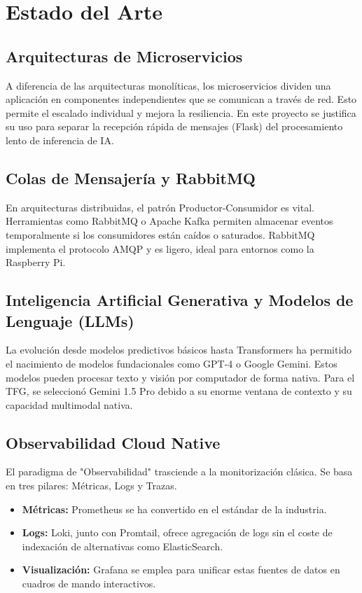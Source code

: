\section{Estado del Arte}
\label{sec:estado_arte}

\subsection{Arquitecturas de Microservicios}
A diferencia de las arquitecturas monolíticas, los microservicios dividen una aplicación en componentes independientes que se comunican a través de red. Esto permite el escalado individual y mejora la resiliencia. En este proyecto se justifica su uso para separar la recepción rápida de mensajes (Flask) del procesamiento lento de inferencia de IA.

\subsection{Colas de Mensajería y RabbitMQ}
En arquitecturas distribuidas, el patrón Productor-Consumidor es vital. Herramientas como RabbitMQ o Apache Kafka permiten almacenar eventos temporalmente si los consumidores están caídos o saturados. RabbitMQ implementa el protocolo AMQP y es ligero, ideal para entornos como la Raspberry Pi.

\subsection{Inteligencia Artificial Generativa y Modelos de Lenguaje (LLMs)}
La evolución desde modelos predictivos básicos hasta Transformers ha permitido el nacimiento de modelos fundacionales como GPT-4 o Google Gemini. Estos modelos pueden procesar texto y visión por computador de forma nativa. Para el TFG, se seleccionó Gemini 1.5 Pro debido a su enorme ventana de contexto y su capacidad multimodal nativa.

\subsection{Observabilidad Cloud Native}
El paradigma de "Observabilidad" trasciende a la monitorización clásica. Se basa en tres pilares: Métricas, Logs y Trazas.
\begin{itemize}
    \item \textbf{Métricas:} Prometheus se ha convertido en el estándar de la industria.
    \item \textbf{Logs:} Loki, junto con Promtail, ofrece agregación de logs sin el coste de indexación de alternativas como ElasticSearch.
    \item \textbf{Visualización:} Grafana se emplea para unificar estas fuentes de datos en cuadros de mando interactivos.
\end{itemize}
